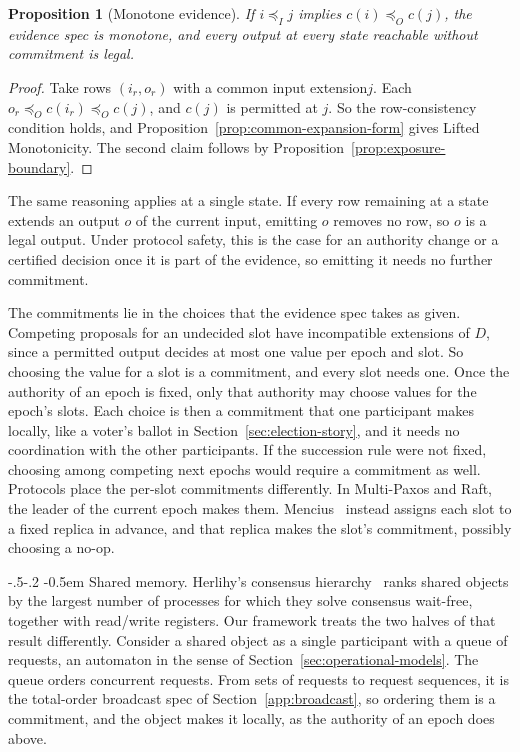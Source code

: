 \documentclass[sigconf]{cidr-2027}
\makeatletter
\newtheorem{proposition}{Proposition}
\theoremstyle{remark}
\renewcommand\paragraph{\@startsection{paragraph}{4}{\z@}%
  {-.5\baselineskip \@plus -2\p@ \@minus -.2\p@}%
  {-0.5em}%
  {\normalfont\bfseries}}
\newcommand{\InputOrd}{\preceq_I}
\newcommand{\OutputOrd}{\preceq_O}
\newcommand{\commitment}{commitment\xspace}
\newcommand{\commitments}{commitments\xspace}
\newcommand{\indesc}{input extension\xspace} %
\newcommand{\outrel}{extends\xspace}          %
\makeatother
\begin{document}
\begin{proposition}[Monotone evidence]
\label{prop:monotone-evidence}
If $i\InputOrd j$ implies $c(i)\OutputOrd c(j)$, the evidence spec is
monotone, and every output at every state reachable without \commitment is
legal.
\end{proposition}

\begin{proof}
Take rows $(i_r,o_r)$ with a common \indesc $j$. Each
$o_r\OutputOrd c(i_r)\OutputOrd c(j)$, and $c(j)$ is permitted at $j$. So the
row-consistency condition holds, and
Proposition~\ref{prop:common-expansion-form} gives Lifted Monotonicity. The
second claim follows by Proposition~\ref{prop:exposure-boundary}.
\end{proof}

The same reasoning applies at a single state. If every row remaining at a
state \outrel an output $o$ of the current input, emitting $o$ removes no row,
so $o$ is a legal output. Under protocol safety, this is the case for an
authority change or a certified decision once it is part of the evidence, so
emitting it needs no further \commitment.

The \commitments lie in the choices that the evidence spec takes as given. Competing proposals for an undecided slot have incompatible extensions of $D$,
since a permitted output decides at most one value per epoch and slot. So
choosing the value for a slot is a \commitment, and every slot needs one. Once
the authority of an epoch is fixed, only that authority may choose values for
the epoch's slots. Each choice is then a \commitment that one participant
makes locally, like a voter's ballot in Section~\ref{sec:election-story}, and
it needs no coordination with the other participants. If the succession rule
were not fixed, choosing among competing next epochs would require a
\commitment as well. Protocols place the per-slot \commitments differently. In Multi-Paxos and Raft, the leader of the current epoch makes them. Mencius~\cite{mao2008mencius} instead assigns each slot to a fixed replica in
advance, and that replica makes the slot's \commitment, possibly choosing a
no-op.

\paragraph{Shared memory.}
Herlihy's consensus hierarchy~\cite{herlihy1991waitfree} ranks shared objects
by the largest number of processes for which they solve consensus wait-free,
together with read/write registers. Our framework treats the two halves of
that result differently. Consider a shared object as a single participant
with a queue of requests, an automaton in the sense of
Section~\ref{sec:operational-models}. The queue orders concurrent requests. From sets of requests to request sequences, it is the total-order broadcast
spec of Section~\ref{app:broadcast}, so ordering them is a \commitment, and
the object makes it locally, as the authority of an epoch does above.
\end{document}
